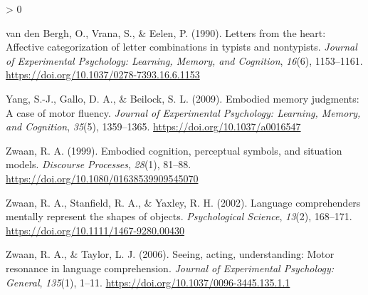 \documentclass[
  english,
  man]{apa7}
\newlength{\cslhangindent}
\newenvironment{CSLReferences}[2] %
 {%
  \setlength{\parindent}{0pt}
  \ifodd #1 \everypar{\setlength{\hangindent}{\cslhangindent}}\ignorespaces\fi
  \ifnum #2 > 0
  \setlength{\parskip}{#2\baselineskip}
  \fi
 }%
 {}
\begin{document}
\begin{CSLReferences}{1}{0}
\leavevmode\hypertarget{ref-VandenBergh1990}{}%
van den Bergh, O., Vrana, S., \& Eelen, P. (1990). {Letters from the heart: Affective categorization of letter combinations in typists and nontypists.} \emph{Journal of Experimental Psychology: Learning, Memory, and Cognition}, \emph{16}(6), 1153--1161. \url{https://doi.org/10.1037/0278-7393.16.6.1153}

\leavevmode\hypertarget{ref-Yang2009}{}%
Yang, S.-J., Gallo, D. A., \& Beilock, S. L. (2009). {Embodied memory judgments: A case of motor fluency.} \emph{Journal of Experimental Psychology: Learning, Memory, and Cognition}, \emph{35}(5), 1359--1365. \url{https://doi.org/10.1037/a0016547}

\leavevmode\hypertarget{ref-Zwaan1999}{}%
Zwaan, R. A. (1999). {Embodied cognition, perceptual symbols, and situation models}. \emph{Discourse Processes}, \emph{28}(1), 81--88. \url{https://doi.org/10.1080/01638539909545070}

\leavevmode\hypertarget{ref-Zwaan2002}{}%
Zwaan, R. A., Stanfield, R. A., \& Yaxley, R. H. (2002). {Language comprehenders mentally represent the shapes of objects}. \emph{Psychological Science}, \emph{13}(2), 168--171. \url{https://doi.org/10.1111/1467-9280.00430}

\leavevmode\hypertarget{ref-Zwaan2006}{}%
Zwaan, R. A., \& Taylor, L. J. (2006). {Seeing, acting, understanding: Motor resonance in language comprehension.} \emph{Journal of Experimental Psychology: General}, \emph{135}(1), 1--11. \url{https://doi.org/10.1037/0096-3445.135.1.1}

\end{CSLReferences}
\end{document}
